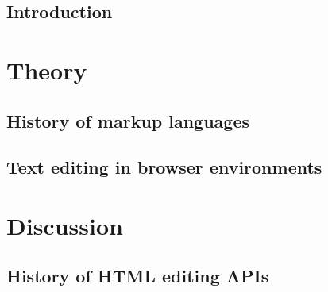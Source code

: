 \chapter{Introduction}



\part{Theory}
\label{part:theory}


%


%

\chapter{History of markup languages}
\label{ch:history_markup}



\chapter{Text editing in browser environments}
\label{ch:browser}






\part{Discussion}
\label{part:discussion}



\chapter{History of HTML editing APIs}
\label{ch:editing_apis_history}

